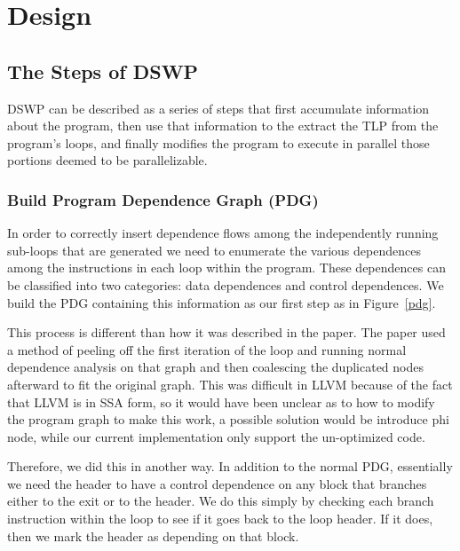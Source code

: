 \documentclass[11pt, letter]{article}
\begin{document}
\section{Design}
\subsection{The Steps of DSWP}
DSWP can be described as a series of steps that first accumulate information about the program, then use that information to the extract the TLP from the program's loops, and finally modifies the program to execute in parallel those portions deemed to be parallelizable.

\subsubsection{Build Program Dependence Graph (PDG)}
In order to correctly insert dependence flows among the independently running sub-loops that are generated we need to enumerate the various dependences among the instructions in each loop within the program.  These dependences can be classified into two categories: data dependences and control dependences.  We build the PDG \cite{PDG} containing this information as our first step as in Figure~\ref{pdg}.

This process is different than how it was described in the paper.  The paper \cite{DSWP-OR} used a method of peeling off the first iteration of the loop and running normal dependence analysis on that graph and then coalescing the duplicated nodes afterward to fit the original graph.  This was difficult in LLVM because of the fact that LLVM is in SSA form, so it would have been unclear as to how to modify the program graph to make this work, a possible solution would be introduce phi node, while our current implementation only support the un-optimized code. 

Therefore, we did this in another way. In addition to the normal PDG, essentially we need the header to have a control dependence on any block that branches either to the exit or to the header.  We do this simply by checking each branch instruction within the loop to see if it goes back to the loop header.  If it does, then we mark the header as depending on that block. 
\end{document}
